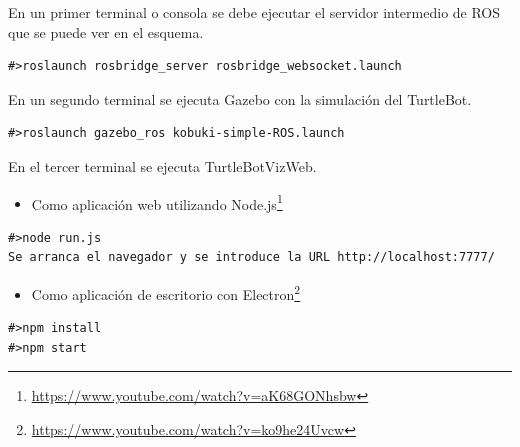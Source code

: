 En un primer terminal o consola se debe ejecutar el servidor intermedio de ROS que se puede ver en el esquema.
\begin{lstlisting}[caption= Ejecución del servidor intermedio, label=cod.servidorintermedioTurtleBot]
#>roslaunch rosbridge_server rosbridge_websocket.launch
\end{lstlisting}
En un segundo terminal se ejecuta Gazebo con la simulación del TurtleBot.

\begin{lstlisting}[caption= Ejecución del driver de ROS label=cod.gazeboturtle]
#>roslaunch gazebo_ros kobuki-simple-ROS.launch
\end{lstlisting}

En el tercer terminal se ejecuta TurtleBotVizWeb.

\begin{itemize}
\item 
Como aplicación web utilizando Node.js\footnote{\url{https://www.youtube.com/watch?v=aK68GONhsbw}}
\end{itemize}
\begin{lstlisting}[caption= Ejecución con Node.js, label=cod.turtlenodejs]
#>node run.js
Se arranca el navegador y se introduce la URL http://localhost:7777/
\end{lstlisting}
\begin{itemize}
\item 
Como aplicación de escritorio con Electron\footnote{\url{https://www.youtube.com/watch?v=ko9he24Uvcw}}
\end{itemize}
\begin{lstlisting}[caption= Ejecución con Electron, label=cod.turtleelectron]
#>npm install
#>npm start
\end{lstlisting}

